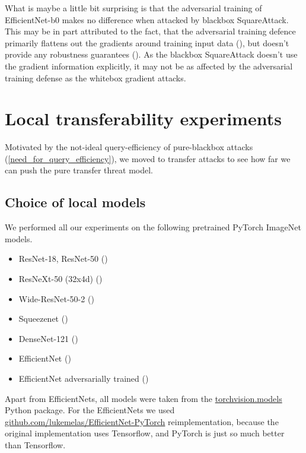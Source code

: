 What is maybe a little bit surprising is that the adversarial training of EfficientNet-b0 makes no difference when attacked by blackbox SquareAttack. This may be in part attributed to the fact, that the adversarial training defence primarily flattens out the gradients around training input data (\cite{Yu2018TowardsRT}), but doesn't provide any robustness guarantees (\cite{Kolter2018ProvableDA}). As the blackbox SquareAttack doesn't use the gradient information explicitly, it may not be as affected by the adversarial training defense as the whitebox gradient attacks.


\section{Local transferability experiments}
\label{local_transfer}
Motivated by the not-ideal query-efficiency of pure-blackbox attacks (\ref{need_for_query_efficiency}), we moved to transfer attacks to see how far we can push the pure transfer threat model.


\subsection{Choice of local models}
We performed all our experiments on the following pretrained PyTorch ImageNet models.

\begin{itemize}
    \item ResNet-18, ResNet-50 (\cite{he2015deep})
    \item ResNeXt-50 (32x4d) (\cite{xie2017aggregated})
    \item Wide-ResNet-50-2 (\cite{zagoruyko2017wide})
    \item Squeezenet (\cite{iandola2016squeezenet})
    \item DenseNet-121 (\cite{huang2018densely})
    \item EfficientNet (\cite{tan2020efficientnet})
    \item EfficientNet adversarially trained (\cite{tramer2020ensemble})
\end{itemize}

Apart from EfficientNets, all models were taken from the \href{https://pytorch.org/vision/stable/models.html}{torchvision.models} Python package. For the EfficientNets we used \href{https://github.com/lukemelas/EfficientNet-PyTorch}{github.com/lukemelas/EfficientNet-PyTorch} reimplementation, because the original implementation uses Tensorflow, and PyTorch is just so much better than Tensorflow.

